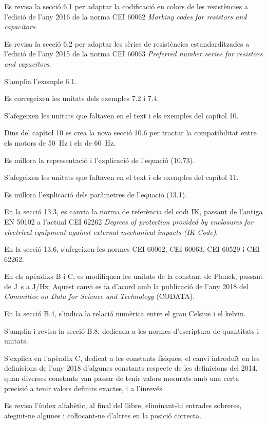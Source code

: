 Es revisa la secció 6.1 per adaptar la codificació en colors de les resistències a l'edició de l'any 2016 de la norma CEI 60062 \textit{Marking codes for resistors and capacitors}.

Es revisa la secció 6.2 per adaptar les sèries de resistències estandarditzades a l'edició de l'any 2015 de la norma CEI 60063 \textit{Preferred number series for resistors and capacitors}.

S'amplia l'exemple 6.1.

Es corregeixen les unitats dels exemples 7.2 i 7.4.

S'afegeixen les unitats que faltaven en el text i els exemples del capítol 10. 

Dins del capítol 10 es crea la nova secció 10.6 per tractar la compatibilitat entre els motors de \qty{50}{Hz} i els de \qty{60}{Hz}.

Es millora la representació i l'explicació de l'equació (10.73).

S'afegeixen les unitats que faltaven en el text i els exemples del capítol 11.

Es millora l'explicació dels paràmetres de l'equació  (13.1).

En la  secció 13.3, es canvia la norma de referència del codi IK, passant de l'antiga EN 50102 a l'actual CEI 62262 \textit{Degrees of protection provided by enclosures for
electrical equipment against external mechanical impacts (IK Code)}.

En la secció 13.6, s'afegeixen les normes CEI 60062,  CEI 60063,  CEI 60529 i  CEI 62262.

En els apèndixs  B i C, es modifiquen les unitats de la constant de Planck, passant de \unit{J.s} a \unit{J/Hz}; Aquest canvi es fa d'acord amb  la publicació de l'any 2018 del \textit{Committee on Data for Science and Technology} (CODATA).

En la secció B.4, s'indica la relació numèrica entre el grau Celsius i el kelvin.

S'amplia i revisa la secció B.8, dedicada a les normes d'escriptura de quantitats i unitats.


S'explica en l'apèndix C, dedicat a les constants físiques,  el canvi introduït en les definicions de l'any 2018 d'algunes constants respecte de les definicions del 2014, quan diverses constants  van passar de tenir valors mesurats amb una certa precisió a tenir valors definits exactes, i a l'inrevés.

Es revisa l'índex alfabètic, al final del llibre, eliminant-hi entrades sobreres, afegint-ne algunes i coŀlocant-ne d'altres en la posició correcta.


